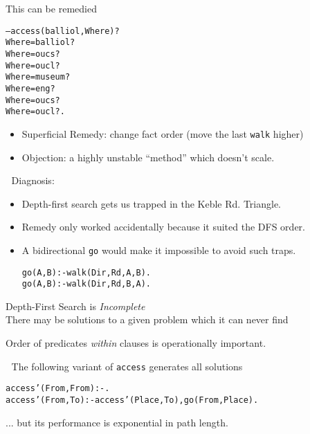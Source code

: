 \documentclass{popl}
\def\user#1{{#1}}
\newenvironment{smalltt}{\begin{alltt}\smaller}{\end{alltt}}
\begin{document}
\begin{foil} 

This can be remedied
\begin{smalltt}
-- \user{access(balliol, Where)?}
Where = balliol ? 
Where = oucs ? 
Where = oucl ? 
Where = museum ? 
Where = eng ? 
Where = oucs ? 
Where = oucl ? \user{.}
\end{smalltt}

\begin{itemize}
\item Superficial Remedy: change fact order (move the last {\tt walk} higher) 
\item Objection: a highly unstable ``method'' which doesn't scale.
\end{itemize}

Diagnosis:
\begin{itemize}
\item Depth-first search gets us trapped in the Keble Rd. Triangle.
\item Remedy only worked accidentally because it suited the DFS order.
\item A bidirectional {\tt go} would make it impossible to avoid such traps.
\begin{smalltt}
        go(A, B) :- walk(Dir, Rd, A, B).
        go(A, B) :- walk(Dir, Rd, B, A).
\end{smalltt}
\end{itemize}

\begin{cframed}[6.5in]
Depth-First Search is {\it Incomplete}
\\
There may be solutions to a given problem which it can never find
\end{cframed}
\end{foil}

\begin{foil}
\begin{cframed}
Order of predicates {\it within} clauses is operationally important.
\end{cframed}

The following variant of {\tt access} generates all solutions 
\begin{smalltt}
        access'(From, From) :- .
        access'(From, To)   :- access'(Place, To), go(From, Place).
\end{smalltt} 
... but its performance is exponential in path length.
\end{foil}
\end{document}
